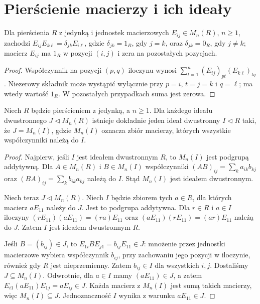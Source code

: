 \section{Pierścienie macierzy i ich ideały}
\begin{lemat}
\label{aa:lem:nc-matrix-units}
Dla pierścienia $R$ z jedynką i jednostek macierzowych
$E_{ij}\in M_n(R)$, $n\ge1$, zachodzi
$E_{ij}E_{k\ell}=\delta_{jk}E_{i\ell}$, gdzie
$\delta_{jk}=1_R$, gdy $j=k$, oraz $\delta_{jk}=0_R$,
gdy $j\ne k$; macierz $E_{ij}$ ma $1_R$ w pozycji
$(i,j)$ i zera na pozostałych pozycjach.
\end{lemat}
\begin{proof}
Współczynnik na pozycji $(p,q)$ iloczynu wynosi
$\sum_{t=1}^n(E_{ij})_{pt}(E_{k\ell})_{tq}$.
Niezerowy składnik może wystąpić wyłącznie przy
$p=i$, $t=j=k$ i $q=\ell$; ma wtedy wartość $1_R$.
W pozostałych przypadkach suma jest zerowa.
\end{proof}

\begin{twierdzenie}
\label{aa:tw:nc-matrix-ideals}
Niech $R$ będzie pierścieniem z jedynką, a $n\ge1$.
Dla każdego ideału dwustronnego $J\triangleleft M_n(R)$
istnieje dokładnie jeden ideał dwustronny $I\triangleleft R$
taki, że $J=M_n(I)$, gdzie $M_n(I)$ oznacza zbiór
macierzy, których wszystkie współczynniki należą do $I$.
\end{twierdzenie}
\begin{proof}
Najpierw, jeśli $I$ jest ideałem dwustronnym $R$,
to $M_n(I)$ jest podgrupą addytywną. Dla
$A\in M_n(R)$ i $B\in M_n(I)$ współczynniki
$(AB)_{ij}=\sum_k a_{ik}b_{kj}$ oraz
$(BA)_{ij}=\sum_k b_{ik}a_{kj}$ należą do $I$.
Stąd $M_n(I)$ jest ideałem dwustronnym.

Niech teraz $J\triangleleft M_n(R)$. Niech $I$ będzie
zbiorem tych $a\in R$, dla których macierz $aE_{11}$
należy do $J$. Jest to podgrupa addytywna. Dla
$r\in R$ i $a\in I$ iloczyny
$(rE_{11})(aE_{11})=(ra)E_{11}$ oraz
$(aE_{11})(rE_{11})=(ar)E_{11}$ należą do $J$.
Zatem $I$ jest ideałem dwustronnym $R$.

Jeśli $B=(b_{ij})\in J$, to
$E_{1i}BE_{j1}=b_{ij}E_{11}\in J$: mnożenie przez
jednostki macierzowe wybiera współczynnik $b_{ij}$,
przy zachowaniu jego pozycji w iloczynie, również
gdy $R$ jest nieprzemienny. Zatem
$b_{ij}\in I$ dla wszystkich $i,j$. Dostaliśmy
$J\subseteq M_n(I)$. Odwrotnie, dla $a\in I$ mamy
$(aE_{11})\in J$, a zatem
$E_{i1}(aE_{11})E_{1j}=aE_{ij}\in J$. Każda
macierz z $M_n(I)$ jest sumą takich macierzy,
więc $M_n(I)\subseteq J$. Jednoznaczność $I$
wynika z warunku $aE_{11}\in J$.
\end{proof}

